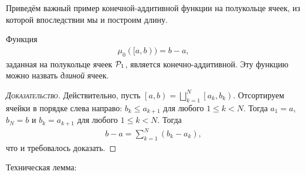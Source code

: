 Приведём важный пример конечной-аддитивной функции на полукольце ячеек, из которой впоследствии мы и построим длину.

\begin{exmpl}
 Функция \begin{align*}
  \mu_0([a, b)) = b - a
 ,\end{align*} заданная на полукольце ячеек $\mathcal{P}_1$, является конечно-аддитивной. Эту функцию можно назвать \textit{длиной} ячеек.
\end{exmpl}
\begin{proof}[\normalfont\textsc{Доказательство}]
 Действительно, пусть $\left[a, b\right) = \bigsqcup_{k=1}^{N} \left[a_k, b_k\right)$. Отсортируем ячейки в порядке слева направо: $b_k \leqslant {a_{k+1}}$ для любого $1 \leqslant k < N$. Тогда $a_1 = a$, $b_N = b$ и $b_k = a_{k+1}$ для любого $1 \leqslant k < N$. Тогда
 \begin{align*}
  b - a = \sum_{k=1}^{N} (b_k - a_k)
 ,\end{align*} что и требовалось доказать.
\end{proof}

Техническая лемма:

